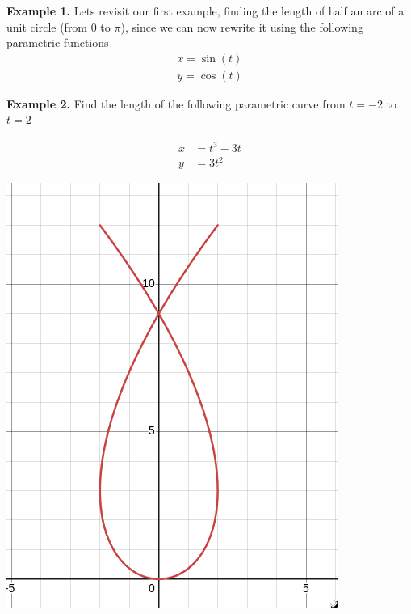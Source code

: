 \documentclass[12pt]{extarticle}
\begin{document}
\textbf{Example 1.} Lets revisit our first example, finding the length of half an arc of a unit circle (from $0$ to $\pi$), since we can now rewrite it using the following parametric functions
\begin{align} 
    x = \sin(t) \\ 
    y = \cos(t) 
\end{align}

\vspace{10cm}

\textbf{Example 2.} Find the length of the following parametric curve from $t = -2$ to $t = 2$

\begin{align} 
    x &= t^3 - 3t \\ 
    y &= 3t^2  
\end{align}

\begin{center}
    \includegraphics[height = 0.3\textheight]{Graph.png}
\end{center}

\vspace{10cm}
\end{document}
